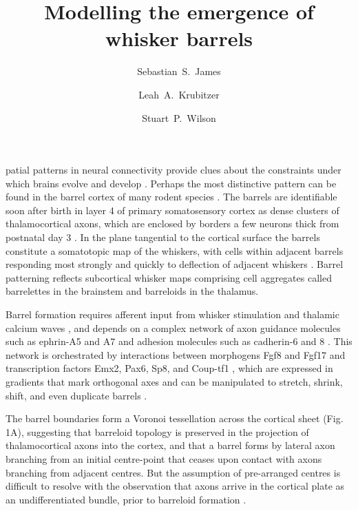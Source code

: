 \documentclass[9pt,twocolumn,twoside,lineno]{pnas-new}
\title{Modelling the emergence of whisker barrels}
\author[a,1]{Sebastian~S.~James}
\author[b]{Leah~A.~Krubitzer}
\author[a]{Stuart~P.~Wilson}
\affil[a]{Department of Psychology, The University of Sheffield, Sheffield, United Kingdom.}
\affil[b]{Center for Neuroscience, The University of California, Davis, United States.}
\begin{document}
\newcommand{\cmnt}[1]{\textcolor{blue}{#1}}
\newcommand{\dvrg}{\nabla\vcdot\nabla}
\newcommand{\e}{\emph}
\newcommand{\bol}{\textbf}
\newcommand{\mb}[1]{\mathbf{#1}}
\makeatletter
\newcommand*\vcdot{\mathpalette\vcdot@{.35}}
\newcommand*\vcdot@[2]{\mathbin{\vcenter{\hbox{\scalebox{#2}{$\m@th#1\bullet$}}}}}
\makeatother

\maketitle
\thispagestyle{firststyle}

\modulolinenumbers{}
\linenumbers

patial patterns in neural connectivity provide clues about the constraints under which brains evolve and develop \citep{purves_iterated_1992}. Perhaps the most distinctive pattern can be found in the barrel cortex of many rodent species \cite{woolsey_structural_1970}. The barrels are identifiable soon after birth in layer 4 of primary somatosensory cortex as dense clusters of thalamocortical axons, which are enclosed by borders a few neurons thick from postnatal day 3 \citep{erzurumlu_development_2012}. In the plane tangential to the cortical surface the barrels constitute a somatotopic map of the whiskers, with cells within adjacent barrels responding most strongly and quickly to deflection of adjacent whiskers \citep{armstrong-james_flow_1992}. Barrel patterning reflects subcortical whisker maps comprising cell aggregates called barrelettes in the brainstem and barreloids in the thalamus.

Barrel formation requires afferent input from whisker stimulation and thalamic calcium waves \citep{anton-bolanos_prenatal_2019}, and depends on a complex network of axon guidance molecules such as ephrin-A5 and A7 and adhesion molecules such as cadherin-6 and 8 \citep{vanderhaeghen_mapping_2000,miller_epha7-ephrin-a5_2006}.
This network is orchestrated by interactions between morphogens Fgf8 and Fgf17 and transcription factors Emx2, Pax6, Sp8, and Coup-tf1 \citep{shimogori_fibroblast_2005}, which are expressed in gradients that mark orthogonal axes and can be manipulated to stretch, shrink, shift, and even duplicate barrels \cite{assimacopoulos_fibroblast_2012}.

The barrel boundaries form a Voronoi tessellation across the cortical sheet \citep{senft_mouse_1991} (Fig.\,1A), suggesting that barreloid topology is preserved in the projection of thalamocortical axons into the cortex, and that a barrel forms by lateral axon branching from an initial centre-point that ceases upon contact with axons branching from adjacent centres. But the assumption of pre-arranged centres is difficult to resolve with the observation that axons arrive in the cortical plate as an undifferentiated bundle, prior to barreloid formation \cite{agmon_organized_1993}.
\end{document}
